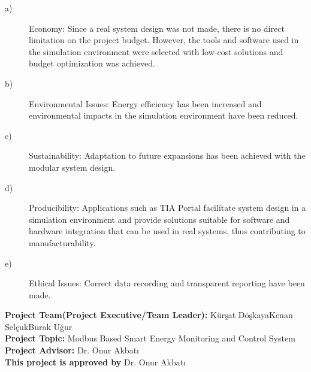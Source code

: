 \begin{description}
  \item[a)] Economy: Since a real system design was not made, there is no direct limitation on the project budget. However, the tools and software used in the simulation environment were selected with low-cost solutions and budget optimization was achieved.
  \item[b)] Environmental Issues: Energy efficiency has been increased and environmental impacts in the simulation environment have been reduced.
  \item[c)] Sustainability: Adaptation to future expansions has been achieved with the modular system design.
  \item[d)] Producibility: Applications such as TIA Portal facilitate system design in a simulation environment and provide solutions suitable for software and hardware integration that can be used in real systems, thus contributing to manufacturability.
  \item[e)] Ethical Issues: Correct data recording and transparent reporting have been made.

\end{description}
\begin{flushleft}
\textbf{Project Team(Project Executive/Team Leader):} {\color{red}Kürşat Döşkaya}{\color{red}Kenan Selçuk}{\color{red}Burak Uğur}\\ 
\textbf{Project Topic:} {\color{red}Modbus Based Smart Energy Monitoring and Control System} \\
\textbf{Project Advisor:}  {\color{red}Dr. Onur Akbatı}\\
\textbf{This project is approved by } {\color{red}Dr. Onur Akbatı} \\
\end{flushleft}